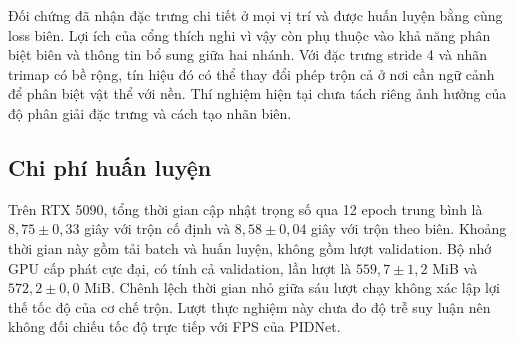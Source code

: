 Đối chứng đã nhận đặc trưng chi tiết ở mọi vị trí và được huấn luyện bằng cùng loss biên. Lợi ích của cổng thích nghi vì vậy còn phụ thuộc vào khả năng phân biệt biên và thông tin bổ sung giữa hai nhánh. Với đặc trưng stride 4 và nhãn trimap có bề rộng, tín hiệu đó có thể thay đổi phép trộn cả ở nơi cần ngữ cảnh để phân biệt vật thể với nền. Thí nghiệm hiện tại chưa tách riêng ảnh hưởng của độ phân giải đặc trưng và cách tạo nhãn biên.

\subsection{Chi phí huấn luyện}

Trên RTX 5090, tổng thời gian cập nhật trọng số qua 12 epoch trung bình là $8{,}75\pm0{,}33$ giây với trộn cố định và $8{,}58\pm0{,}04$ giây với trộn theo biên. Khoảng thời gian này gồm tải batch và huấn luyện, không gồm lượt validation. Bộ nhớ GPU cấp phát cực đại, có tính cả validation, lần lượt là $559{,}7\pm1{,}2$ MiB và $572{,}2\pm0{,}0$ MiB. Chênh lệch thời gian nhỏ giữa sáu lượt chạy không xác lập lợi thế tốc độ của cơ chế trộn. Lượt thực nghiệm này chưa đo độ trễ suy luận nên không đối chiếu tốc độ trực tiếp với FPS của PIDNet.
